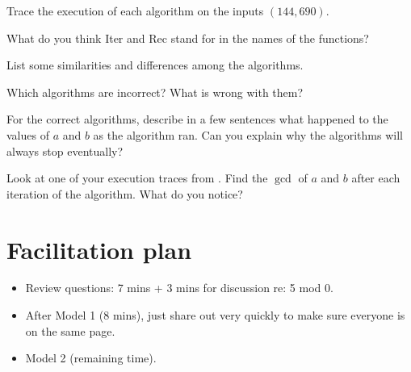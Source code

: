\documentclass{tufte-handout}
\begin{document}
\begin{questions}
\item \label{q:trace} Trace the execution of each algorithm on the inputs
  $(144,690)$.
\end{questions}

\newpage
\begin{questions}
\item What do you think \textsf{Iter} and \textsf{Rec} stand for in
  the names of the functions?
\item List some similarities and differences among the algorithms.
\item Which algorithms are incorrect?  What is wrong with them?
\item For the correct algorithms, describe in a few sentences what
  happened to the values of $a$ and $b$ as the algorithm ran.  Can you
  explain why the algorithms will always stop eventually?
\item Look at one of your execution traces from .  Find
  the $\gcd$ of $a$ and $b$ after each iteration of the algorithm.
  What do you notice?
\end{questions}

\newpage

\section{Facilitation plan}
\label{sec:facilitation}

\begin{itemize}
\item Review questions: 7 mins + 3 mins for discussion re: 5 mod 0.

\item After Model 1 (8 mins), just share out very quickly to make sure
  everyone is on the same page.

\item Model 2 (remaining time).

\end{itemize}
\end{document}
